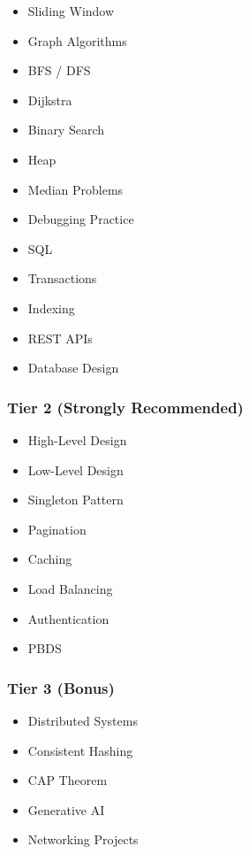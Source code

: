 \documentclass[11pt,a4paper]{article}
\begin{document}
\begin{itemize}
	\item Sliding Window
	\item Graph Algorithms
	\item BFS / DFS
	\item Dijkstra
	\item Binary Search
	\item Heap
	\item Median Problems
	\item Debugging Practice
	\item SQL
	\item Transactions
	\item Indexing
	\item REST APIs
	\item Database Design
\end{itemize}

\subsubsection{Tier 2 (Strongly Recommended)}

\begin{itemize}
	\item High-Level Design
	\item Low-Level Design
	\item Singleton Pattern
	\item Pagination
	\item Caching
	\item Load Balancing
	\item Authentication
	\item PBDS
\end{itemize}

\subsubsection{Tier 3 (Bonus)}

\begin{itemize}
	\item Distributed Systems
	\item Consistent Hashing
	\item CAP Theorem
	\item Generative AI
	\item Networking Projects
\end{itemize}

\end{document}
